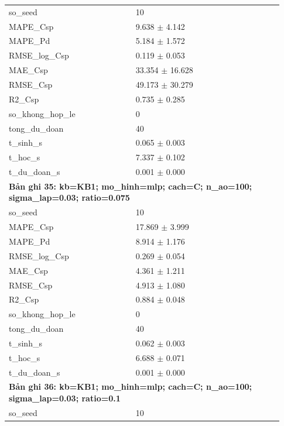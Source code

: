 \begin{longtable}{p{0.43\linewidth}p{0.50\linewidth}}
so\_\allowbreak seed & 10 \\
MAPE\_\allowbreak Csp & 9.638 $\pm$ 4.142 \\
MAPE\_\allowbreak Pd & 5.184 $\pm$ 1.572 \\
RMSE\_\allowbreak log\_\allowbreak Csp & 0.119 $\pm$ 0.053 \\
MAE\_\allowbreak Csp & 33.354 $\pm$ 16.628 \\
RMSE\_\allowbreak Csp & 49.173 $\pm$ 30.279 \\
R2\_\allowbreak Csp & 0.735 $\pm$ 0.285 \\
so\_\allowbreak khong\_\allowbreak hop\_\allowbreak le & 0 \\
tong\_\allowbreak du\_\allowbreak doan & 40 \\
t\_\allowbreak sinh\_\allowbreak s & 0.065 $\pm$ 0.003 \\
t\_\allowbreak hoc\_\allowbreak s & 7.337 $\pm$ 0.102 \\
t\_\allowbreak du\_\allowbreak doan\_\allowbreak s & 0.001 $\pm$ 0.000 \\
\midrule
\multicolumn{2}{p{0.95\linewidth}}{\textbf{Bản ghi 35: kb=KB1; mo\_hinh=mlp; cach=C; n\_ao=100; sigma\_lap=0.03; ratio=0.075}} \\
so\_\allowbreak seed & 10 \\
MAPE\_\allowbreak Csp & 17.869 $\pm$ 3.999 \\
MAPE\_\allowbreak Pd & 8.914 $\pm$ 1.176 \\
RMSE\_\allowbreak log\_\allowbreak Csp & 0.269 $\pm$ 0.054 \\
MAE\_\allowbreak Csp & 4.361 $\pm$ 1.211 \\
RMSE\_\allowbreak Csp & 4.913 $\pm$ 1.080 \\
R2\_\allowbreak Csp & 0.884 $\pm$ 0.048 \\
so\_\allowbreak khong\_\allowbreak hop\_\allowbreak le & 0 \\
tong\_\allowbreak du\_\allowbreak doan & 40 \\
t\_\allowbreak sinh\_\allowbreak s & 0.062 $\pm$ 0.003 \\
t\_\allowbreak hoc\_\allowbreak s & 6.688 $\pm$ 0.071 \\
t\_\allowbreak du\_\allowbreak doan\_\allowbreak s & 0.001 $\pm$ 0.000 \\
\midrule
\multicolumn{2}{p{0.95\linewidth}}{\textbf{Bản ghi 36: kb=KB1; mo\_hinh=mlp; cach=C; n\_ao=100; sigma\_lap=0.03; ratio=0.1}} \\
so\_\allowbreak seed & 10 \\

\end{longtable}
